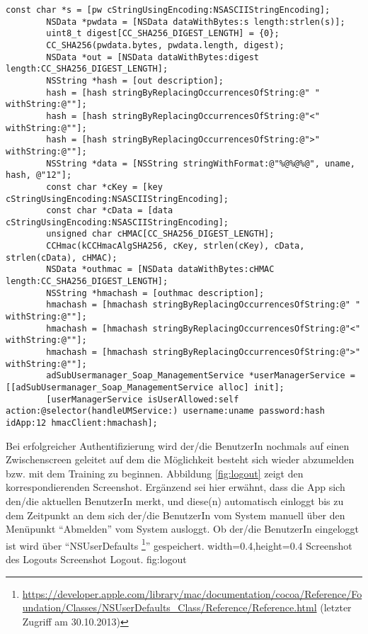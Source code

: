 \begin{lstlisting}[caption=Objective-C Code zur Erstellung des Hashs, label=listing:hash]
        const char *s = [pw cStringUsingEncoding:NSASCIIStringEncoding];
        NSData *pwdata = [NSData dataWithBytes:s length:strlen(s)];
        uint8_t digest[CC_SHA256_DIGEST_LENGTH] = {0};
        CC_SHA256(pwdata.bytes, pwdata.length, digest);
        NSData *out = [NSData dataWithBytes:digest length:CC_SHA256_DIGEST_LENGTH];
        NSString *hash = [out description];
        hash = [hash stringByReplacingOccurrencesOfString:@" " withString:@""];
        hash = [hash stringByReplacingOccurrencesOfString:@"<" withString:@""];
        hash = [hash stringByReplacingOccurrencesOfString:@">" withString:@""];
        NSString *data = [NSString stringWithFormat:@"%@%@%@", uname, hash, @"12"];
        const char *cKey = [key cStringUsingEncoding:NSASCIIStringEncoding];
        const char *cData = [data cStringUsingEncoding:NSASCIIStringEncoding];
        unsigned char cHMAC[CC_SHA256_DIGEST_LENGTH];
        CCHmac(kCCHmacAlgSHA256, cKey, strlen(cKey), cData, strlen(cData), cHMAC);
        NSData *outhmac = [NSData dataWithBytes:cHMAC length:CC_SHA256_DIGEST_LENGTH];
        NSString *hmachash = [outhmac description];
        hmachash = [hmachash stringByReplacingOccurrencesOfString:@" " withString:@""];
        hmachash = [hmachash stringByReplacingOccurrencesOfString:@"<" withString:@""];
        hmachash = [hmachash stringByReplacingOccurrencesOfString:@">" withString:@""];
        adSubUsermanager_Soap_ManagementService *userManagerService = [[adSubUsermanager_Soap_ManagementService alloc] init];
        [userManagerService isUserAllowed:self action:@selector(handleUMService:) username:uname password:hash idApp:12 hmacClient:hmachash];
\end{lstlisting} 

Bei erfolgreicher Authentifizierung wird der/die BenutzerIn nochmals auf einen Zwischenscreen geleitet auf 
dem die Möglichkeit besteht sich wieder abzumelden bzw. mit dem Training zu beginnen. Abbildung \ref{fig:logout} zeigt
den korrespondierenden Screenshot. Ergänzend sei hier erwähnt, dass die App sich den/die aktuellen BenutzerIn merkt, und diese(n) automatisch einloggt bis zu
dem Zeitpunkt an dem sich der/die BenutzerIn vom System manuell über den Menüpunkt \enquote{Abmelden} vom System 
ausloggt. Ob der/die BenutzerIn eingeloggt ist wird über \enquote{NSUserDefaults \footnote{\url{https://developer.apple.com/library/mac/documentation/cocoa/Reference/Foundation/Classes/NSUserDefaults_Class/Reference/Reference.html} (letzter Zugriff am 30.10.2013)}}
gespeichert.
  {width=0.4\textwidth,height=0.4\textheight}%
  {Screenshot des Logouts}%
  {Screenshot Logout.}%
  {fig:logout}%
  
